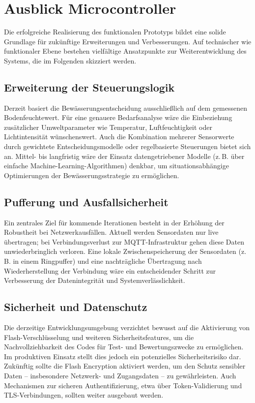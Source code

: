 \section{Ausblick Microcontroller}

Die erfolgreiche Realisierung des funktionalen Prototyps bildet eine solide Grundlage für zukünftige Erweiterungen und Verbesserungen. Auf technischer wie funktionaler Ebene bestehen vielfältige Ansatzpunkte zur Weiterentwicklung des Systems, die im Folgenden skizziert werden.

\subsection{Erweiterung der Steuerungslogik}

Derzeit basiert die Bewässerungsentscheidung ausschließlich auf dem gemessenen Bodenfeuchtewert. Für eine genauere Bedarfsanalyse wäre die Einbeziehung zusätzlicher Umweltparameter wie Temperatur, Luftfeuchtigkeit oder Lichtintensität wünschenswert. Auch die Kombination mehrerer Sensorwerte durch gewichtete Entscheidungsmodelle oder regelbasierte Steuerungen bietet sich an. Mittel- bis langfristig wäre der Einsatz datengetriebener Modelle (z.\,B. über einfache Machine-Learning-Algorithmen) denkbar, um situationsabhängige Optimierungen der Bewässerungsstrategie zu ermöglichen.

\subsection{Pufferung und Ausfallsicherheit}

Ein zentrales Ziel für kommende Iterationen besteht in der Erhöhung der Robustheit bei Netzwerkausfällen. Aktuell werden Sensordaten nur live übertragen; bei Verbindungsverlust zur MQTT-Infrastruktur gehen diese Daten unwiederbringlich verloren. Eine lokale Zwischenspeicherung der Sensordaten (z.\,B. in einem Ringpuffer) und eine nachträgliche Übertragung nach Wiederherstellung der Verbindung wäre ein entscheidender Schritt zur Verbesserung der Datenintegrität und Systemverlässlichkeit.

\subsection{Sicherheit und Datenschutz}

Die derzeitige Entwicklungsumgebung verzichtet bewusst auf die Aktivierung von Flash-Verschlüsselung und weiteren Sicherheitsfeatures, um die Nachvollziehbarkeit des Codes für Test- und Bewertungszwecke zu ermöglichen. Im produktiven Einsatz stellt dies jedoch ein potenzielles Sicherheitsrisiko dar. Zukünftig sollte die Flash Encryption aktiviert werden, um den Schutz sensibler Daten – insbesondere Netzwerk- und Zugangsdaten – zu gewährleisten. Auch Mechanismen zur sicheren Authentifizierung, etwa über Token-Validierung und TLS-Verbindungen, sollten weiter ausgebaut werden.

